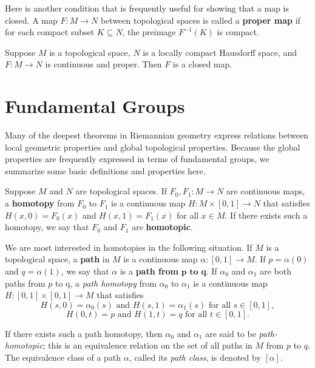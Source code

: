 Here is another condition that is frequently useful for showing that a map is closed. A map $F : M \to N$ between topological spaces is called a \textbf{proper map} if for each compact subset $K \subseteq N$, the preimage $F^{-1}(K)$ is compact.

\begin{proposition}
\label{prop:proper-continuous-maps-closed}
Suppose $M$ is a topological space, $N$ is a locally compact Hausdorff space, and $F : M \to N$ is continuous and proper. Then $F$ is a closed map.
\end{proposition}

\section{Fundamental Groups}

Many of the deepest theorems in Riemannian geometry express relations between local geometric properties and global topological properties. Because the global properties are frequently expressed in terms of fundamental groups, we summarize some basic definitions and properties here.

Suppose $M$ and $N$ are topological spaces. If $F_0, F_1 : M \to N$ are continuous maps, a \textbf{homotopy} from $F_0$ to $F_1$ is a continuous map $H : M \times [0,1] \to N$ that satisfies $H(x,0) = F_0(x)$ and $H(x,1) = F_1(x)$ for all $x \in M$. If there exists such a homotopy, we say that $F_0$ and $F_1$ are \textbf{homotopic}.

We are most interested in homotopies in the following situation. If $M$ is a topological space, a \textbf{path} in $M$ is a continuous map $\alpha : [0,1] \to M$. If $p = \alpha(0)$ and $q = \alpha(1)$, we say that $\alpha$ is a \textbf{path from} $\textbf{p to q}$. If $\alpha_0$ and $\alpha_1$ are both paths from $p$ to q, a \emph{path homotopy} from $\alpha_0$ to $\alpha_1$ is a continuous map $H: [0,1] \times [0,1] \to M$ that satisfies
\[
H(s,0) = \alpha_0(s) \text{ and } H(s,1) = \alpha_1(s) \text{ for all } s \in [0,1],
\]
\[
H(0,t) = p \text{ and } H(1,t) = q \text{ for all } t \in [0,1].
\]

If there exists such a path homotopy, then $\alpha_0$ and $\alpha_1$ are said to be \emph{path-homotopic};
this is an equivalence relation on the set of all paths in $M$ from $p$ to $q$. The
equivalence class of a path $\alpha$, called its \emph{path class}, is denoted by $[\alpha]$.

